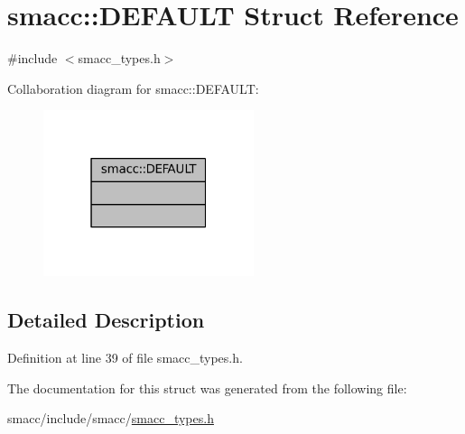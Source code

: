 \hypertarget{structsmacc_1_1DEFAULT}{}\section{smacc\+:\+:D\+E\+F\+A\+U\+LT Struct Reference}
\label{structsmacc_1_1DEFAULT}


{\ttfamily \#include $<$smacc\+\_\+types.\+h$>$}



Collaboration diagram for smacc\+:\+:D\+E\+F\+A\+U\+LT\+:
\nopagebreak
\begin{figure}[H]
\begin{center}
\leavevmode
\includegraphics[width=175pt]{structsmacc_1_1DEFAULT__coll__graph}
\end{center}
\end{figure}


\subsection{Detailed Description}


Definition at line 39 of file smacc\+\_\+types.\+h.



The documentation for this struct was generated from the following file\+:\begin{DoxyCompactItemize}
\item 
smacc/include/smacc/\hyperlink{smacc__types_8h}{smacc\+\_\+types.\+h}\end{DoxyCompactItemize}
